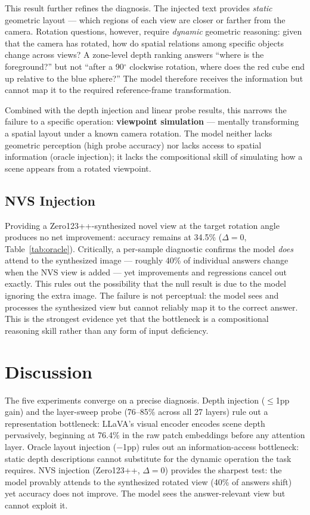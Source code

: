 \documentclass[11pt]{article}
\begin{document}
This result further refines the diagnosis.
The injected text provides \emph{static} geometric layout --- which regions of
each view are closer or farther from the camera.
Rotation questions, however, require \emph{dynamic} geometric reasoning:
given that the camera has rotated, how do spatial relations among specific objects
change across views?
A zone-level depth ranking answers ``where is the foreground?'' but not
``after a 90$^\circ$ clockwise rotation, where does the red cube end up
relative to the blue sphere?''
The model therefore receives the information but cannot map it to the
required reference-frame transformation.

Combined with the depth injection and linear probe results, this narrows the
failure to a specific operation: \textbf{viewpoint simulation} ---
mentally transforming a spatial layout under a known camera rotation.
The model neither lacks geometric perception (high probe accuracy) nor
lacks access to spatial information (oracle injection); it lacks the
compositional skill of simulating how a scene appears from a rotated viewpoint.

\subsection{NVS Injection}
\label{sec:nvs}
Providing a Zero123++-synthesized novel view at the target rotation angle
produces no net improvement: accuracy remains at 34.5\% ($\Delta = 0$,
Table~\ref{tab:oracle}).
Critically, a per-sample diagnostic confirms the model \emph{does} attend to
the synthesized image --- roughly 40\% of individual answers change when the
NVS view is added --- yet improvements and regressions cancel out exactly.
This rules out the possibility that the null result is due to the model ignoring
the extra image.
The failure is not perceptual: the model sees and processes the synthesized view
but cannot reliably map it to the correct answer.
This is the strongest evidence yet that the bottleneck is a compositional
reasoning skill rather than any form of input deficiency.

\section{Discussion}
The five experiments converge on a precise diagnosis.
Depth injection ($\leq$1pp gain) and the layer-sweep probe (76--85\% across
all 27 layers) rule out a representation bottleneck: LLaVA's visual encoder
encodes scene depth pervasively, beginning at 76.4\% in the raw patch
embeddings before any attention layer.
Oracle layout injection ($-$1pp) rules out an information-access bottleneck:
static depth descriptions cannot substitute for the dynamic operation the task
requires.
NVS injection (Zero123++, $\Delta = 0$) provides the sharpest test: the model
provably attends to the synthesized rotated view (40\% of answers shift) yet
accuracy does not improve.
The model sees the answer-relevant view but cannot exploit it.
\end{document}
